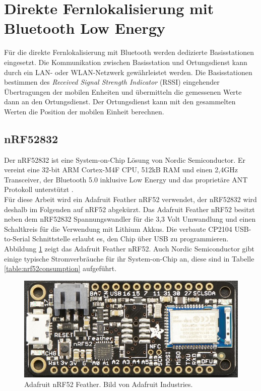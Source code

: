 \section{Direkte Fernlokalisierung mit Bluetooth Low Energy}
\label{ch:phase3}
Für die direkte Fernlokalisierung mit Bluetooth werden dedizierte Basisstationen eingesetzt. 
Die Kommunikation zwischen Basisstation und Ortungsdienst kann durch ein LAN- oder WLAN-Netzwerk gewährleistet werden.
Die Basisstationen bestimmen des \emph{Received Signal Strength Indicator} (RSSI) eingehender Übertragungen der mobilen Enheiten und übermitteln die gemessenen Werte dann an den Ortungsdienst.
Der Ortungsdienst kann mit den gesammelten Werten die Position der mobilen Einheit berechnen.

\subsection{nRF52832}
Der nRF52832 ist eine System-on-Chip Lösung von Nordic Semiconductor.
Er vereint eine 32-bit ARM Cortex-M4F CPU, 512kB RAM und einen 2,4GHz Transceiver, der Bluetooth 5.0 inklusive Low Energy und das proprietäre ANT Protokoll unterstützt \cite{nordic2017nrf}.\\
Für diese Arbeit wird ein Adafruit Feather nRF52 verwendet, der nRF52832 wird deshalb im Folgenden auf nRF52 abgekürzt.
Das Adafruit Feather nRF52 besitzt neben dem nRF52832 Spannungswandler für die 3,3 Volt Umwandlung und einen Schaltkreis für die Verwendung mit Lithium Akkus. 
Die verbaute CP2104 USB-to-Serial Schnittstelle erlaubt es, den Chip über USB zu programmieren.\\
Abbildung \ref{fig:nrf52layout} zeigt das Adafruit Feather nRF52.
Auch Nordic Semiconductor gibt einige typische Stromverbräuche für ihr System-on-Chip an, diese sind in Tabelle \ref{table:nrf52consumption} aufgeführt.

\begin{figure}[h]
  \centering
	\includegraphics[width=\textwidth]{images/nrf52ada.png}
  \caption{Adafruit nRF52 Feather. Bild von Adafruit Industries.}
  \label{fig:nrf52layout}
\end{figure}

